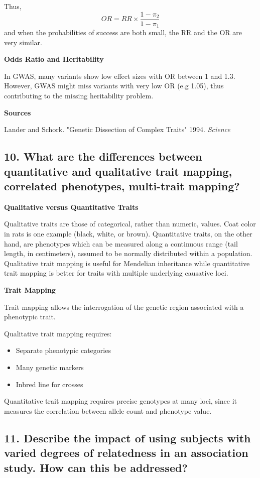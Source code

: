 \documentclass{tufte-handout}
\theoremstyle{noparens}
\begin{document}
Thus, \[ OR = RR \times \frac{1-\pi_2}{1-\pi_1} \] and when the probabilities of success are both small, the RR and the OR are very similar.
 
 \noindent
 \textbf{Odds Ratio and Heritability}
 
 In GWAS, many variants show low effect sizes with OR between 1 and 1.3. However, GWAS might miss variants with very low OR (e.g 1.05), thus contributing to the missing heritability problem. 
 
 \textbf{Sources}
 
 Lander and Schork. "Genetic Dissection of Complex Traits" 1994. \emph{Science}
 
\newpage
\subsection{10. What are the differences between quantitative and qualitative trait mapping, correlated phenotypes, multi-trait mapping?}

\textbf{Qualitative versus Quantitative Traits}

Qualitative traits are those of categorical, rather than numeric, values. Coat color in rats is one example (black, white, or brown). Quantitative traits, on the other hand, are phenotypes which can be measured along a continuous range (tail length, in centimeters), assumed to be normally distributed within a population. Qualitative trait mapping is useful for Mendelian inheritance while quantitative trait mapping is better for traits with multiple underlying causative loci.

\textbf{Trait Mapping}

Trait mapping allows the interrogation of the genetic region associated with a phenotypic trait. 

Qualitative trait mapping requires:

\begin{itemize}
\item Separate phenotypic categories
\item Many genetic markers
\item Inbred line for crosses
\end{itemize}

Quantitative trait mapping requires precise genotypes at many loci, since it measures the correlation between allele count and phenotype value.

\newpage
\subsection{11. Describe the impact of using subjects with varied degrees of relatedness in an association study. How can this be addressed?}
\end{document}
